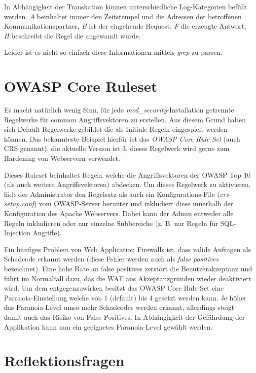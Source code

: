 In Abhängigkeit der Transkation können unterschiedliche Log-Kategorien befüllt werden. \textit{A} beinhaltet immer den Zeitstempel und die Adressen der betroffenen Kommunikationspartner, \textit{B} ist der eingehende Request, \textit{F} die erzeugte Antwort; \textit{H} beschreibt die Regel die angewandt wurde.

Leider ist es nicht so einfach diese Informationen mittels \textit{grep} zu parsen.

\section{OWASP Core Ruleset}

Es macht natürlich wenig Sinn, für jede \textit{mod\_security}-Installation getrennte Regelwerke für common Angriffsvektoren zu erstellen. Aus diesem Grund haben sich Default-Regelwerke gebildet die als Initiale Regeln eingespielt werden können. Das bekannteste Beispiel hierfür ist das \textit{OWASP Core Rule Set} (auch CRS genannt), die aktuelle Version ist 3, dieses Regelwerk wird gerne zum Hardening von Webservern verwendet.

Dieses Ruleset beinhaltet Regeln welche die Angriffsvektoren der OWASP Top 10 (als auch weitere Angriffsvektoren) abdecken. Um dieses Regelwerk zu aktivieren, lädt der Administrator den Regelsatz als auch ein Konfigurations-File (\textit{crs-setup.conf}) vom OWASP-Server herunter und inkludiert diese innerhalb der Konfiguration des Apache Webservers. Dabei kann der Admin entweder alle Regeln inkludieren oder nur einzelne Subbereiche (z. B. nur Regeln für SQL-Injection Angriffe).

Ein häufiges Problem von Web Application Firewalls ist, dass valide Anfragen als Schadcode erkannt werden (diese Fehler werden auch als \textit{false positives} bezeichnet). Eine hohe Rate an false positives zerstört die Benutzerakzeptanz und führt im Normalfall dazu, das die WAF aus Akzeptanzgründen wieder deaktiviert wird. Um dem entgegenzuwirken besitzt das OWASP Core Rule Set eine Paranoia-Einstellung welche von 1 (default) bis 4 gesetzt werden kann. Je höher das Paranoia-Level umso mehr Schadcodes werden erkannt, allerdings steigt damit auch das Risiko von False-Positives. In Abhängigkeit der Gefährdung der Applikation kann nun ein geeignetes Paranoia-Level gewählt werden.

\section{Reflektionsfragen}

